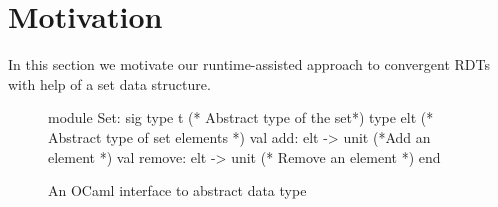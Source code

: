 \section{Motivation}
\label{sec:motivation}


In this section we motivate our runtime-assisted approach to
convergent RDTs with help of a set data structure.

\begin{figure}[ht]
\centering
\begin{ocaml}
module Set: sig
  type t (* Abstract type of the set*)    
  type elt (* Abstract type of set elements *)
  val add: elt -> unit (*Add an element *)
  val remove: elt -> unit (* Remove an element *)
end
\end{ocaml}
\caption{An OCaml interface to  abstract data type}
\label{fig:ocaml-set}
\end{figure}

